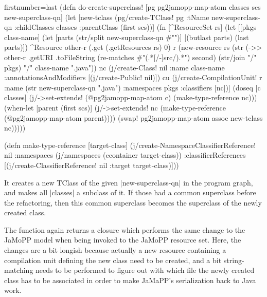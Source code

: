 \documentclass[submission]{eptcs}
\newcommand{\code}{\clojureinline}
\begin{document}
\begin{clojurecode*}{firstnumber=last}
(defn do-create-superclass! [pg pg2jamopp-map-atom classes scs new-superclass-qn]
  (let [new-tclass (pg/create-TClass! pg {:tName new-superclass-qn
                                          :childClasses classes
                                          :parentClass (first scs)})]
    (fn [^ResourceSet rs]
      (let [[pkgs class-name] (let [parts (str/split new-superclass-qn #"\.")]
                                [(butlast parts) (last parts)])
            ^Resource other-r (.get (.getResources rs) 0)
            r (new-resource rs (str (->> other-r .getURI .toFileString
                                         (re-matches #"(.*[/-]src/).*")
                                         second)
                                    (str/join "/" pkgs) "/" class-name ".java"))
            nc (j/create-Class! nil {:name class-name
                                     :annotationsAndModifiers [(j/create-Public! nil)]})
            cu (j/create-CompilationUnit! r {:name (str new-superclass-qn ".java")
                                             :namespaces  pkgs
                                             :classifiers [nc]})]
        (doseq [c classes]
          (j/->set-extends! (@pg2jamopp-map-atom c) (make-type-reference nc)))
        (when-let [parent (first scs)]
          (j/->set-extends! nc (make-type-reference (@pg2jamopp-map-atom parent))))
        (swap! pg2jamopp-map-atom assoc new-tclass nc)))))

(defn make-type-reference [target-class]
  (j/create-NamespaceClassifierReference!
   nil {:namespaces (j/namespaces (econtainer target-class))
        :classifierReferences [(j/create-ClassifierReference!
                                nil {:target target-class})]}))
\end{clojurecode*}

It creates a new \textsf{TClass} of the given \code|new-superclass-qn| in the
program graph, and makes all \code|classes| a subclass of it.  If those had a
common superclass before the refactoring, then this common superclass becomes
the superclass of the newly created class.

The function again returns a closure which performs the same change to the
JaMoPP model when being invoked to the JaMoPP resource set.  Here, the changes
are a bit longish because actually a new resource containing a compilation unit
defining the new class need to be created, and a bit string-matching needs to
be performed to figure out with which file the newly created class has to be
associated in order to make JaMaPP's serialization back to Java work.
\end{document}
